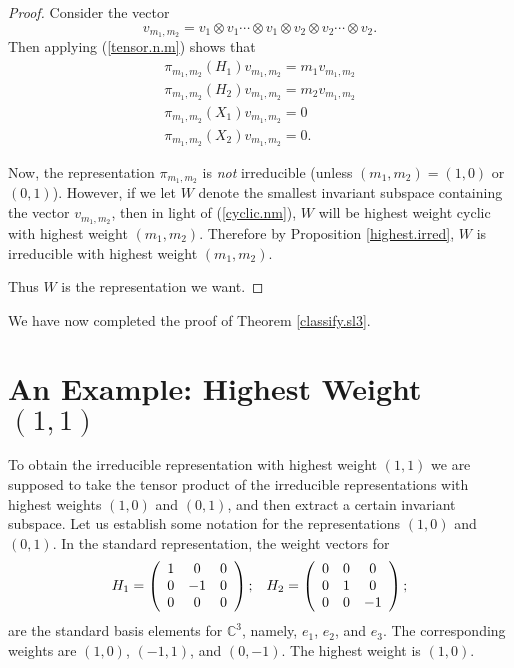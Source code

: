 \documentclass[12pt]{amsbook}
\theoremstyle{plain}
\numberwithin{equation}{chapter}
\numberwithin{theorem}{chapter}
\begin{document}
\begin{proof}
Consider the vector
\[
v_{m_{1},m_{2}}=v_{1}\otimes v_{1}\cdots\otimes v_{1}\otimes v_{2}\otimes
v_{2}\cdots\otimes v_{2}\text{.}%
\]
Then applying (\ref{tensor.n.m}) shows that
\begin{align}
\pi_{m_{1},m_{2}}(H_{1})v_{m_{1},m_{2}}=m_{1}v_{m_{1},m_{2}}\nonumber\\
\pi_{m_{1},m_{2}}(H_{2})v_{m_{1},m_{2}}=m_{2}v_{m_{1},m_{2}}\nonumber\\
\pi_{m_{1},m_{2}}(X_{1})v_{m_{1},m_{2}}=0\nonumber\\
\pi_{m_{1},m_{2}}(X_{2})v_{m_{1},m_{2}}=0\text{.}\label{cyclic.nm}%
\end{align}

Now, the representation $\pi_{m_{1},m_{2}}$ is \textit{not} irreducible
(unless $(m_{1},m_{2})=\left(  1,0\right)  $ or $\left(  0,1\right)  $).
However, if we let $W$ denote the smallest invariant subspace containing the
vector $v_{m_{1},m_{2}}$, then in light of (\ref{cyclic.nm}), $W$ will be
highest weight cyclic with highest weight $(m_{1},m_{2})$. Therefore by
Proposition \ref{highest.irred}, $W$ is irreducible with highest weight
$(m_{1},m_{2})$.

Thus $W$ is the representation we want.
\end{proof}

We have now completed the proof of Theorem \ref{classify.sl3}.

\section{An Example: Highest Weight $\left(  1,1\right)  $}

To obtain the irreducible representation with highest weight $\left(
1,1\right)  $ we are supposed to take the tensor product of the irreducible
representations with highest weights $\left(  1,0\right)  $ and $\left(
0,1\right)  $, and then extract a certain invariant subspace. Let us establish
some notation for the representations $\left(  1,0\right)  $ and $\left(
0,1\right)  $. In the standard representation, the weight vectors for
\[%
\begin{array}
[c]{cc}%
H_{1}=\left(
\begin{array}
[c]{ccc}%
1 & 0 & 0\\
0 & -1 & 0\\
0 & 0 & 0
\end{array}
\right)  ; & H_{2}=\left(
\begin{array}
[c]{ccc}%
0 & 0 & 0\\
0 & 1 & 0\\
0 & 0 & -1
\end{array}
\right)  ;
\end{array}
\]
are the standard basis elements for $\mathbb{C}^{3}$, namely, $e_{1}$, $e_{2}%
$, and $e_{3}$. The corresponding weights are $\left(  1,0\right)  $, $\left(
-1,1\right)  $, and $\left(  0,-1\right)  $. The highest weight is $\left(
1,0\right)  $.
\end{document}
